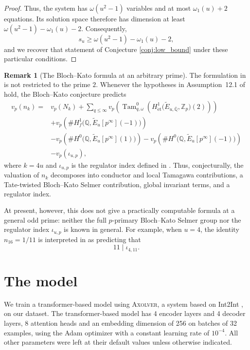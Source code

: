 \documentclass[12pt]{amsart}%
\newcommand{\1}{\mathds{1}}
\newcommand{\Q}{\mathbb{Q}}
\newcommand{\Z}{\mathbb{Z}}
\theoremstyle{definition}
\newtheorem{rem}[thm]{Remark}
\numberwithin{equation}{section}
\numberwithin{table}{section}
\numberwithin{figure}{section}
\begin{document}
\begin{proof}
Thus, the system has $\omega(u^2 - 1)$ variables and at most $\omega_1(u) + 2$ equations. Its solution space therefore has dimension at least   $\omega(u^2-1)-\omega_1(u)-2$. Consequently,
\[
s_u \geq \omega(u^2-1)-\omega_1(u)-2,
\]
and we recover  that statement of Conjecture \ref{conj:low_bound} under these particular conditions.
\end{proof}
\begin{rem}[The Bloch--Kato formula at an arbitrary prime]
\label{rem:general-BK}
The formulation in \cite[\S12]{DGJK} is not restricted to the prime
$2$.
Whenever the hypotheses in Assumption~12.1 of \cite{DGJK} hold, the
Bloch--Kato conjecture predicts
\[
\begin{aligned}
v_p(n_{k})
={}&v_p(N_{k})
+\sum_{q\leq\infty}
v_p\!\left(
\operatorname{Tam}_{q,\omega}^{0}(H^1_{\mathrm{\acute et}}
\bigl(\widetilde E_{u,\overline{\Q}},\Z_p\bigr)(2))
\right)\\
&+
v_p\!\left(
\#H_f^1\bigl(\Q,\widetilde E_u[p^\infty](-1)\bigr)
\right)\\
&-
v_p\!\left(
\#H^0\bigl(\Q,\widetilde E_u[p^\infty](1)\bigr)
\right)
-
v_p\!\left(
\#H^0\bigl(\Q,\widetilde E_u[p^\infty](-1)\bigr)
\right)\\
&-v_p(\iota_{u,p}),
\end{aligned}
\]
where $k=4u$ and $\iota_{u,p}$ is the regulator index defined in
\cite[\S12]{DGJK}. Thus, conjecturally, the valuation of $n_k$
decomposes into conductor and local Tamagawa contributions, a
Tate-twisted Bloch--Kato Selmer contribution, global invariant
terms, and a regulator index.


At present, however, this does not give a practically computable
formula at a general odd prime: neither the full $p$-primary
Bloch--Kato Selmer group nor the regulator index
$\iota_{u,p}$ is known in general.  For example, when $u=4$,
the identity $n_{16}=1/11$ is interpreted in \cite{DGJK} as
predicting that
\[
11\mid\iota_{4,11}.
\]
\end{rem}

\section{The model} \label{sec:model}

We train a transformer-based model \cite{transformer} using \textsc{Axolver}, a system based on Int2Int \cite{Axolver}, on our dataset. The transformer-based model has 4 encoder layers and 4 decoder layers, 8 attention heads and an embedding dimension of 256 on batches of 32 examples, using the Adam optimizer \cite{adam} with a constant learning rate of $10^{-4}$. All other parameters were left at their default values unless otherwise indicated.%
\end{document}
